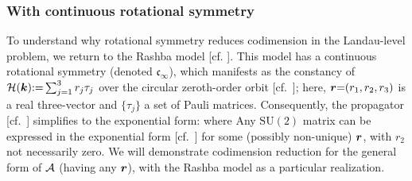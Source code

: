 \documentclass[aps, prb, showpacs, twocolumn, notitlepage, superscriptaddress]{revtex4-1}
\begin{document}


\subsubsection{With continuous rotational symmetry}\label{sec:ctsrot}

To understand why rotational symmetry reduces codimension in the Landau-level problem, we return to the Rashba model [cf. ]. This model has a continuous rotational symmetry (denoted $\mathfrak{c}_{\infty}$), which manifests as the constancy of ${\cal H}(\boldsymbol{k}){:}{=}\sum_{j=1}^3r_j\tau_j$ over the circular zeroth-order orbit [cf.\ ]; here, $\boldsymbol{r}{=}(r_1,r_2,r_3)$ is a real three-vector and $\{\tau_j\}$ a set of Pauli matrices. Consequently, the propagator [cf.\ ] simplifies to the exponential form:
where
Any $\text{SU}(2)$ matrix can be expressed in the exponential form [cf.\ ] for some (possibly non-unique) $\boldsymbol{r}$, with $r_2$ not necessarily zero. We will demonstrate codimension reduction for the general form of ${\cal A}$ (having any $\boldsymbol{r}$), with the Rashba model as a particular realization.
\end{document}
